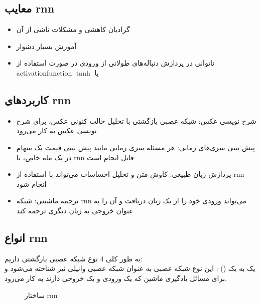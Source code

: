  \subsection{معایب \gls{rnn}}
 \begin{itemize}
 	\item گرادیان کاهشی و مشکلات ناشی از آن
 	\item آموزش بسیار دشوار
 	\item ناتوانی در پردازش دنباله‌های طولانی از ورودی در صورت استفاده از \gls{activationfunction}  $\tanh$ یا 
 \end{itemize}

\subsection{کاربردهای \gls{rnn}}
\begin{itemize}
	\item شرح نویسی عکس: شبکه عصبی بازگشتی با تحلیل حالت کنونی عکس، برای شرح نویسی عکس به کار می‌رود
	\item پیش بینی سری‌های زمانی: هر مسئله سری زمانی مانند پیش بینی قیمت یک سهام در یک ماه خاص، با \gls{rnn} قابل انجام است
	\item
	پردازش زبان طبیعی: کاوش متن و تحلیل احساسات می‌تواند با استفاده از \gls{rnn} انجام شود
	\item
	ترجمه ماشینی: شبکه \gls{rnn} می‌تواند ورودی خود را از یک زبان دریافت و آن را به عنوان خروجی به زبان دیگری ترجمه کند
\end{itemize}
 
\subsection{انواع \gls{rnn}}
\noindent
 به طور کلی 4 نوع شبکه عصبی بازگشتی داریم:\\
 یک به یک () : این نوع شبکه عصبی به عنوان شبکه عصبی وانیلی نیز شناخته می‌شود و برای مسائل یادگیری ماشین که یک ورودی و یک خروجی دارند به کار می‌رود.

 \begin{figure}[!ht]
 	\centering
 	\hfill
 	\hfil
 	 	\hfill
 	\caption{ساختار \gls{rnn}}
 	\label{fig:ch_lr:rnn_xtx}
 \end{figure}
 
